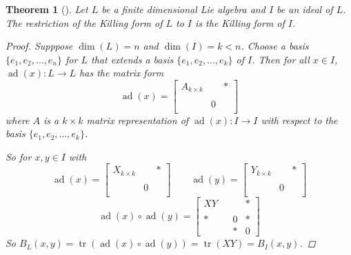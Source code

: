\documentclass[letterpaper, 10pt]{article}
\theoremstyle{theostyle}
\newtheorem{theorem}{Theorem}[section]
\newenvironment{thmstyle}[1][]{%
    \begin{theorem}[#1]\leavevmode\vspace{-\baselineskip}\myquote%
    }{\endmyquote\end{theorem}}
\begin{document}
\begin{thmstyle}
    Let \(L\) be a finite dimensional Lie algebra and \(I\) be an ideal of \(L\).
    The restriction of the Killing form of \(L\) to \(I\) is the Killing form of \(I\).

    \begin{proof}
        Supppose \(\dim{(L)} = n\) and \(\dim{(I)} = k < n\).
        Choose a basis \(\{e_1, e_2, \dots, e_n\}\) for \(L\) that extends a basis \(\{e_1, e_2, \dots, e_k\}\) of \(I\).
        Then for all \(x \in I\), \(\operatorname{ad}{(x)}: L \rightarrow L\) has the matrix form
        \[\operatorname{ad}{(x)} = \begin{bmatrix}
            A_{k \times k} & & \ast \\
            \\
            & 0 & \\
        \end{bmatrix}
        \]
        where \(A\) is a \(k \times k\) matrix representation of \(\operatorname{ad}{(x)}: I \rightarrow I\) with respect to the basis \(\{e_1, e_2, \dots, e_k\}\).
        
        So for \(x, y \in I\) with 
        \[\operatorname{ad}{(x)} = \begin{bmatrix}
            X_{k \times k} & & \ast \\
            \\
            & 0 & \\
        \end{bmatrix} \qquad \operatorname{ad}{(y)} = \begin{bmatrix}
            Y_{k \times k} & & \ast \\
            \\
            & 0 & \\
        \end{bmatrix}
        \]
        \[\operatorname{ad}{(x)} \circ \operatorname{ad}{(y)} = \begin{bmatrix}
            XY & & & \ast \\
            \\
            \ast & & 0 & \ast \\
            & & \ast & 0
        \end{bmatrix}
        \]
        So \(B_L(x,y) = \operatorname{tr}{(\operatorname{ad}{(x)} \circ \operatorname{ad}{(y)})} = \operatorname{tr}{(XY)} = B_I(x,y)\).
    \end{proof}
\end{thmstyle}
\end{document}
